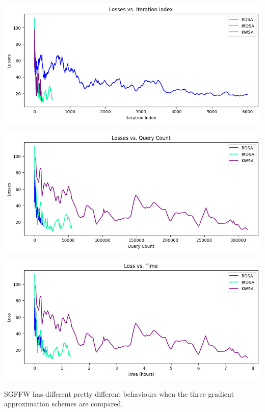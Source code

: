 \documentclass[10pt,twocolumn,letterpaper]{article}
\begin{document}
\begin{center}
   \includegraphics*[scale=0.35]{img/SGFFW_loss_vs_iterations.png}
\end{center}

\begin{center}
   \includegraphics*[scale=0.35]{img/SGFFW_loss_vs_querycount.png}
\end{center}

\begin{center}
   \includegraphics*[scale=0.35]{img/SGFFW_loss_vs_runningtime.png}
\end{center}

SGFFW has different pretty different behaviours when the three gradient approximation schemes
are compared.
\end{document}
